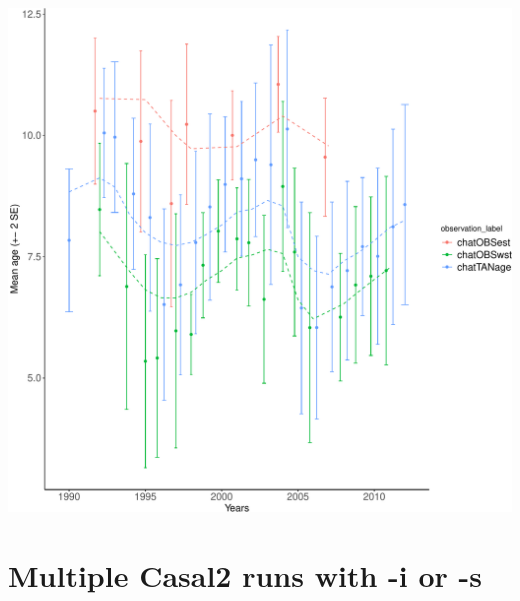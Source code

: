 \documentclass[
]{book}
\begin{document}
\includegraphics{_main_files/figure-latex/plot_mean_age_fit-2.pdf}

\hypertarget{multiple-casal2-runs-with--i-or--s}{%
\section{Multiple Casal2 runs with -i or -s}\label{multiple-casal2-runs-with--i-or--s}}
\end{document}
